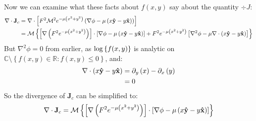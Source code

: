 \documentclass{article}
\begin{document}
Now we can examine what these facts about $f(x,y)$ say about the quantity
$\div{J}$:
\begin{align}
    \nabla \cdot \mathbf{J}_c &= \nabla \cdot \left[ F^2 \mathcal{M}^2 e^{-
        \mu \left( x^2 + y^2 \right)} \left(
        \nabla \phi - \mu \left( x\mathbf{ \hat{ y }} -
        y\mathbf{ \hat{ x }} \right) \right) \right] \\
    &= \mathcal{M} \left\{ \left[
        \nabla \left( F^2 e^{- \mu \left( x^2 + y^2 \right)} \right) \right]
        \cdot \left[ \nabla \phi - \mu \left( x\mathbf{ \hat{ y }} - y \mathbf{ \hat{ x }} \right)
        \right]
        + F^2 e^{- \mu \left( x^2 + y^2 \right)} \left[ \nabla^2 \phi - \mu \nabla
        \cdot \left( x\mathbf{ \hat{ y }} - y\mathbf{ \hat{ x }} \right) \right]
        \right\}
\end{align}
But $\nabla^2 \phi = 0$ from earlier, as $\log \left\{ f(x,y) \right\}$ is analytic on
$\mathbb{C} \setminus \left\{ f(x,y) \in \mathbb{R} : f(x,y) \leq 0 \right\}$, and:
\begin{align}
    \nabla \cdot \left( x\mathbf{ \hat{ y }} - y\mathbf{ \hat{ x }} \right)
    &= \partial_y \left( x \right) - \partial_x \left( y \right) \\
    &= 0
\end{align}
So the divergence of $\mathbf{J}_c$ can be simplified to:
\begin{align}
    \nabla \cdot \mathbf{J}_c = \mathcal{M} \left\{
        \left[ \nabla \left( F^2 e^{- \mu \left( x^2 + y^2 \right)} \right)
            \right] \cdot
            \left[ \nabla \phi - \mu \left( x \mathbf{ \hat{ y }} - y \mathbf{ \hat{ x }} \right)
        \right] \right\}
\end{align}
\end{document}
